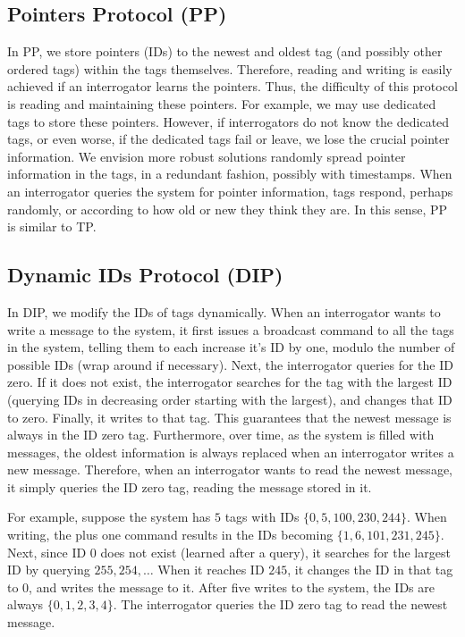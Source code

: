 \documentclass[conference]{IEEEtran}
\begin{document}
\subsection{Pointers Protocol (PP)}
In PP, we store pointers (IDs) to the newest and oldest tag (and possibly other ordered tags) within the tags themselves.  Therefore, reading and writing is easily achieved if an interrogator learns the pointers.  Thus, the difficulty of this protocol is reading and maintaining these pointers.  For example, we may use dedicated tags to store these pointers.  However, if interrogators do not know the dedicated tags, or even worse, if the dedicated tags fail or leave, we lose the crucial pointer information.  We envision more robust solutions randomly spread pointer information in the tags, in a redundant fashion, possibly with timestamps.  When an interrogator queries the system for pointer information, tags respond, perhaps randomly, or according to how old or new they think they are.  In this sense, PP is similar to TP.

\subsection{Dynamic IDs Protocol (DIP)}
In DIP, we modify the IDs of tags dynamically.  When an interrogator wants to write a message to the system, it first issues a broadcast command to all the tags in the system, telling them to each increase it's ID by one, modulo the number of possible IDs (wrap around if necessary).  Next, the interrogator queries for the ID zero.  If it does not exist, the interrogator searches for the tag with the largest ID (querying IDs in decreasing order starting with the largest), and changes that ID to zero.  Finally, it writes to that tag.  This guarantees that the newest message is always in the ID zero tag.  Furthermore, over time, as the system is filled with messages, the oldest information is always replaced when an interrogator writes a new message.  Therefore, when an interrogator wants to read the newest message, it simply queries the ID zero tag, reading the message stored in it.  

For example, suppose the system has $5$ tags with IDs $\{0, 5, 100, 230, 244\}$.  When writing, the plus one command results in the IDs becoming $\{1, 6, 101, 231, 245\}$.  Next, since ID $0$ does not exist (learned after a query), it searches for the largest ID by querying $255, 254, \ldots$  When it reaches ID $245$, it changes the ID in that tag to $0$, and writes the message to it.  After five writes to the system, the IDs are always $\{0, 1, 2, 3, 4\}$.  The interrogator queries the ID zero tag to read the newest message.
\end{document}
